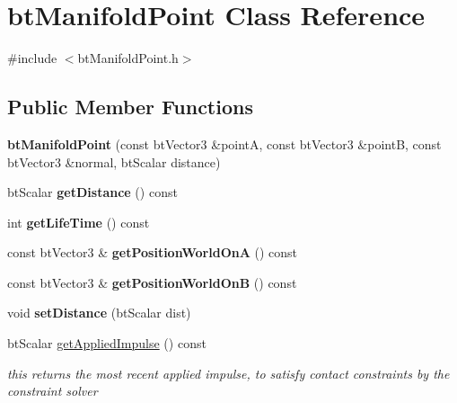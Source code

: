 \hypertarget{classbt_manifold_point}{\section{bt\+Manifold\+Point Class Reference}
\label{classbt_manifold_point}
}


{\ttfamily \#include $<$bt\+Manifold\+Point.\+h$>$}

\subsection*{Public Member Functions}
\begin{DoxyCompactItemize}
\item 
\hypertarget{classbt_manifold_point_afe9cbdf9719330ba37bf4079c2896159}{{\bfseries bt\+Manifold\+Point} (const bt\+Vector3 \&point\+A, const bt\+Vector3 \&point\+B, const bt\+Vector3 \&normal, bt\+Scalar distance)}\label{classbt_manifold_point_afe9cbdf9719330ba37bf4079c2896159}

\item 
\hypertarget{classbt_manifold_point_a856b627cca8572340c538e4ed208ef1e}{bt\+Scalar {\bfseries get\+Distance} () const }\label{classbt_manifold_point_a856b627cca8572340c538e4ed208ef1e}

\item 
\hypertarget{classbt_manifold_point_ac5f9c894e3707fddd78ac7717f165996}{int {\bfseries get\+Life\+Time} () const }\label{classbt_manifold_point_ac5f9c894e3707fddd78ac7717f165996}

\item 
\hypertarget{classbt_manifold_point_ac4fb334242b89daa97eb635ca69cb01f}{const bt\+Vector3 \& {\bfseries get\+Position\+World\+On\+A} () const }\label{classbt_manifold_point_ac4fb334242b89daa97eb635ca69cb01f}

\item 
\hypertarget{classbt_manifold_point_a7da5c494f2efa8fc4ccf3e14f70b7875}{const bt\+Vector3 \& {\bfseries get\+Position\+World\+On\+B} () const }\label{classbt_manifold_point_a7da5c494f2efa8fc4ccf3e14f70b7875}

\item 
\hypertarget{classbt_manifold_point_a952646d751054a5c942e01198ab85cf3}{void {\bfseries set\+Distance} (bt\+Scalar dist)}\label{classbt_manifold_point_a952646d751054a5c942e01198ab85cf3}

\item 
\hypertarget{classbt_manifold_point_a2506e3d421b66b430db8e8dbf5ad8d1e}{bt\+Scalar \hyperlink{classbt_manifold_point_a2506e3d421b66b430db8e8dbf5ad8d1e}{get\+Applied\+Impulse} () const }\label{classbt_manifold_point_a2506e3d421b66b430db8e8dbf5ad8d1e}

\begin{DoxyCompactList}\small\item\em this returns the most recent applied impulse, to satisfy contact constraints by the constraint solver \end{DoxyCompactList}\end{DoxyCompactItemize}
